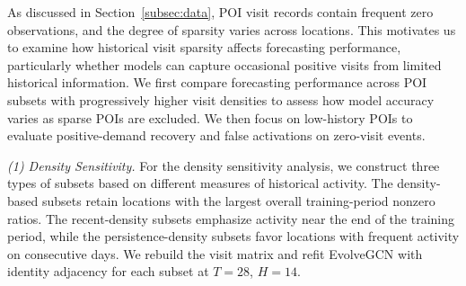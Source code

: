 \documentclass[preprint,authoryear,11pt]{elsarticle}
\theoremstyle{definition}
\begin{document}
As discussed in Section~\ref{subsec:data}, POI visit records contain frequent zero observations, and the degree of sparsity varies across locations.
This motivates us to examine how historical visit sparsity affects forecasting performance, particularly whether models can capture occasional positive visits from limited historical information.
We first compare forecasting performance across POI subsets with progressively higher visit densities to assess how model accuracy varies as sparse POIs are excluded.
We then focus on low-history POIs to evaluate positive-demand recovery and false activations on zero-visit events.


\textit{(1) Density Sensitivity.}
For the density sensitivity analysis, we construct three types of subsets based on different measures of historical activity.
The density-based subsets retain locations with the largest overall training-period nonzero ratios.
The recent-density subsets emphasize activity near the end of the training period, while the persistence-density subsets favor locations with frequent activity on consecutive days.
We rebuild the visit matrix and refit EvolveGCN with identity adjacency for each subset at \(T=28\), \(H=14\).
\end{document}
